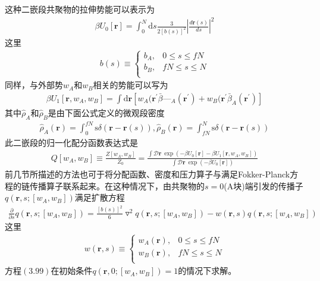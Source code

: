 这种二嵌段共聚物的拉伸势能可以表示为
\begin{gather}
\beta U_0[\mathbf{r}]=\int_{0}^{N} \mathrm{d}s\frac{3}{2[b(s)]^2}\left| \frac{d\mathbf{r}(s)}{ds} \right|^2
\end{gather}
这里
\begin{gather}
b(s)\equiv
\begin{cases}
b_A, & 0\leq s \leq fN \\
b_B, & fN \leq s \leq N\\
\end{cases}
\end{gather}
同样，与外部势$w_A$和$w_B$相关的势能可以写为
\begin{gather}
\beta U_1[\mathbf{r},w_A,w_B]=\int \mathrm{d}\mathbf{r}[w_A(\mathbf{r}^{'}\bar{\beta}—_A(\mathbf{r}^{'})+w_B(\mathbf{r}^{'}\bar{\beta}_A(\mathbf{r}^{'})]
\end{gather}
其中$\hat{\rho} _A$和$\hat{\rho} _B$是由下面公式定义的微观段密度
\begin{gather}
\hat{\rho} _A(\mathbf{r})=\int _0^{fN} \mathrm{s}\delta(\mathbf{r}-\mathbf{r}(s)),\hat{\rho} _B(\mathbf{r})=\int _{fN}^{N} \mathrm{s}\delta(\mathbf{r}-\mathbf{r}(s))
\end{gather}
此二嵌段的归一化配分函数表达式是
\begin{gather}
Q[w_A,w_B]\equiv\frac{Z[w_A,w_B]}{Z_0}=\frac{\int \mathcal{D}\mathbf{r}~\exp(-\beta U_0[\mathbf{r}]-\beta U_1[\mathbf{r},w_A,w_B])}{\int \mathcal{D}\mathbf{r}~\exp(-\beta U_0[\mathbf{r}])}
\end{gather}
前几节所描述的方法也可于将分配函数、密度和压力算子与满足Fokker-Planck方程的链传播算子联系起来。在这种情况下，由共聚物的$s=0$(A块)端引发的传播子$q(\mathbf{r},s;[w_A,w_B])$满足扩散方程
\begin{gather}
\frac{\partial}{\partial s}q(\mathbf{r},s;[w_A,w_B])=\frac{[b(s)]^2}{6}\triangledown ^2q(\mathbf{r},s;[w_A,w_B])-w(\mathbf{r},s)q(\mathbf{r},s;[w_A,w_B])
\end{gather}
这里
\begin{gather}
w(\mathbf{r},s)\equiv
\begin{cases}
w_A(\mathbf{r}), & 0\leq s \leq fN \\
w_B(\mathbf{r}), & fN \leq s \leq N\\
\end{cases}
\end{gather}
方程$(3.99)$在初始条件$q(\mathbf{r},0;[w_A,w_B])=1$的情况下求解。

